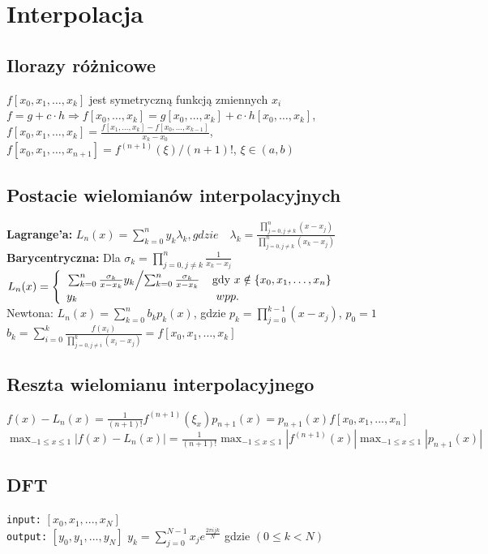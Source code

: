 \documentclass[a4paper,twocolumn]{article}
\begin{document}
\section{Interpolacja}
\subsection{Ilorazy różnicowe}
$f[x_0,x_1, \ldots, x_k]$ jest symetryczną funkcją zmiennych $x_i$\\ $f = g+c\cdot h \Rightarrow f[x_0,\ldots,x_k]=g[x_0,\ldots,x_k]+c\cdot h[x_0,\ldots,x_k]$,\\ $f[x_0, x_1,\ldots,x_k] = \frac{f[x_1,\ldots,x_k]-f[x_0,\ldots,x_{k-1}]}{x_k-x_0}$,\\
$f[x_0,x_1,\ldots,x_{n+1}] = f^{(n+1)}(\xi) / (n+1)!$, $\xi \in (a,b)$

\subsection{Postacie wielomianów interpolacyjnych}
\textbf{Lagrange'a:} $L_n(x) =\sum_{k=0}^ny_k
\lambda_k ,gdzie\quad \lambda_k=\frac{\prod_{j=0, j\neq k}^{n}(x-x_j)}{\prod_{j=0, j\neq k}^{n}(x_k-x_j)}$\\
\textbf{Barycentryczna:}
Dla $\sigma_k = \prod^n_{j=0, j\neq k}\frac{1}{x_k-x_j}$\\
$  L_n(x) = \left\{ \begin{array}{ll}
\left. \sum_{k=0}^n\frac{\sigma_k}{x-x_k}y_k \middle/ \sum_{k=0}^n\frac{\sigma_k}{x-x_k} \right. & \textrm{gdy $x \notin \left\{ x_0,x_1,\dots,x_n \right\} $}\\
y_k & \textrm{ $ wpp. $}
\end{array} \right.
$\\
Newtona: 
$ L_n(x) = \sum_{k=0}^n b_kp_k(x)$, gdzie $p_k = \prod_{j = 0}^{k-1} (x - x_j)$, $p_0 = 1$ \\
$b_k = \sum_{i = 0}^k \frac{f(x_i)}{\prod_{j = 0, j\neq i}^k (x_i - x_j)} = f[x_0, x_1, \ldots, x_k]$

\subsection{Reszta wielomianu interpolacyjnego}
$f(x)-L_n(x) = \frac{1}{(n+1)!}f^{(n+1)}(\xi_x)p_{n+1}(x) = p_{n+1}(x)f[x_0, x_1, ..., x_n]$\\
$\max_{-1\leq x \leq 1} | f(x)-L_n(x) | = \frac{1}{(n+1)!}\max_{-1\leq x \leq 1} | f^{(n+1)}(x) | \max_{-1\leq x \leq 1} | p_{n+1}(x) |$
\subsection{DFT}
\texttt{input:} $[x_0, x_1, ..., x_N]$\\
\texttt{output:} $[y_0, y_1, ..., y_N]$
$y_k = \sum_{j = 0}^{N-1} x_j e^{\frac{2 \pi i j k}{N}} $ gdzie $ (0 \leqslant k < N)$
\end{document}
